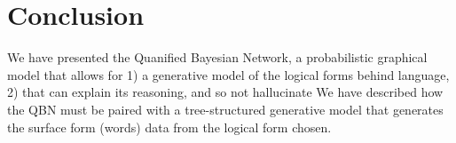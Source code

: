 \documentclass[12pt]{article}
\begin{document}
\section{Conclusion}
We have presented the Quanified Bayesian Network, a probabilistic graphical model that allows for 1) a generative model of the logical forms behind language, 2) that can explain its reasoning, and so not hallucinate
We have described how the QBN must be paired with a tree-structured generative model that generates the surface form (words) data from the logical form chosen.



\end{document}
